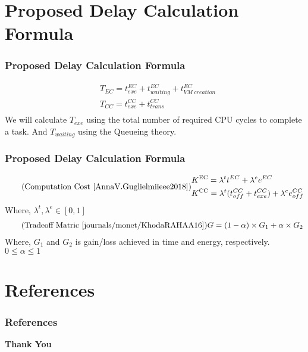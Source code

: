 \documentclass[usenames,dvipsnames]{beamer}
\begin{document}
\section{Proposed Delay Calculation Formula}
\begin{frame}
 \frametitle{Proposed Delay Calculation Formula}
 \begin{equation*}
  \begin{aligned}
   & T_{EC}=t^{EC}_{exe}+t^{EC}_{waiting}+t^{EC}_{VM\ creation}\\
   & T_{CC}=t^{CC}_{exe}+t^{CC}_{trans}\\
  \end{aligned}
 \end{equation*}
 We will calculate $T_{exe}$ using the total number of required CPU cycles to complete a task. And $T_{waiting}$ using the Queueing theory.
\end{frame}

\begin{frame}
  \frametitle{Proposed Delay Calculation Formula}
  \begin{equation}
  \tag{Computation Cost \cite{AnnaV.Guglielmiieee2018}}
   \begin{aligned}
 & K\textsuperscript{EC} = \lambda^tt^{EC}+\lambda^ee^{EC}\\
   & K\textsuperscript{CC} = \lambda^t(t^{CC}_{off}+t^{CC}_{exe})+\lambda^ee^{CC}_{off}\\
 \end{aligned}
 \end{equation}
 Where,  $\lambda^t,\lambda^e \in [0,1]$
 \begin{equation*}
 \tag{Tradeoff Matric \cite{journals/monet/KhodaRAHAA16}}
  \begin{aligned}
   & G = (1- \alpha )\times G_1+\alpha \times G_2\\
  \end{aligned}
 \end{equation*}
 Where, $G_1$ and $G_2$ is gain/loss achieved in time and energy, respectively. $0 \le \alpha \le 1$

\end{frame}

\section{References}
\begin{frame}
  \frametitle{References}
  \printbibliography
% 
\end{frame}

\begin{frame}{\phantom{}}
  \color{Sepia}
  \centering \Huge\textbf{Thank You}
\end{frame}
\end{document}

